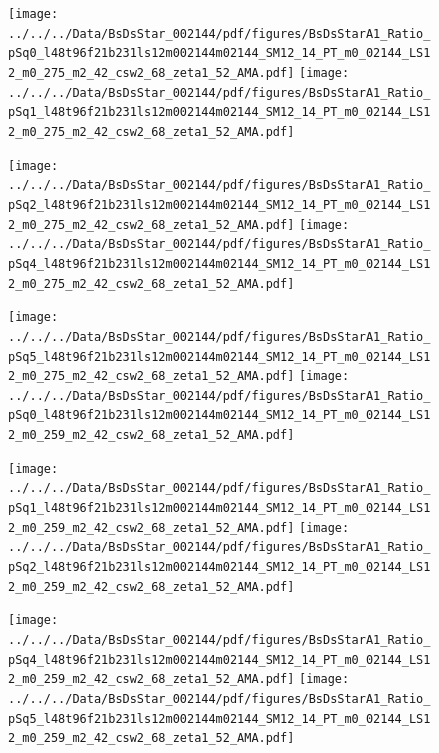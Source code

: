 \documentclass[a4paper,10pt]{article}
\begin{document}
\begin{figure}[p]
 \texttt{[image: ../../../Data/BsDsStar\_002144/pdf/figures/BsDsStarA1\_Ratio\_pSq0\_l48t96f21b231ls12m002144m02144\_SM12\_14\_PT\_m0\_02144\_LS12\_m0\_275\_m2\_42\_csw2\_68\_zeta1\_52\_AMA.pdf]} 
 \texttt{[image: ../../../Data/BsDsStar\_002144/pdf/figures/BsDsStarA1\_Ratio\_pSq1\_l48t96f21b231ls12m002144m02144\_SM12\_14\_PT\_m0\_02144\_LS12\_m0\_275\_m2\_42\_csw2\_68\_zeta1\_52\_AMA.pdf]} 
 \end{figure}
\begin{figure}[p]
 \texttt{[image: ../../../Data/BsDsStar\_002144/pdf/figures/BsDsStarA1\_Ratio\_pSq2\_l48t96f21b231ls12m002144m02144\_SM12\_14\_PT\_m0\_02144\_LS12\_m0\_275\_m2\_42\_csw2\_68\_zeta1\_52\_AMA.pdf]} 
 \texttt{[image: ../../../Data/BsDsStar\_002144/pdf/figures/BsDsStarA1\_Ratio\_pSq4\_l48t96f21b231ls12m002144m02144\_SM12\_14\_PT\_m0\_02144\_LS12\_m0\_275\_m2\_42\_csw2\_68\_zeta1\_52\_AMA.pdf]} 
 \end{figure}
\begin{figure}[p]
 \texttt{[image: ../../../Data/BsDsStar\_002144/pdf/figures/BsDsStarA1\_Ratio\_pSq5\_l48t96f21b231ls12m002144m02144\_SM12\_14\_PT\_m0\_02144\_LS12\_m0\_275\_m2\_42\_csw2\_68\_zeta1\_52\_AMA.pdf]} 
 \texttt{[image: ../../../Data/BsDsStar\_002144/pdf/figures/BsDsStarA1\_Ratio\_pSq0\_l48t96f21b231ls12m002144m02144\_SM12\_14\_PT\_m0\_02144\_LS12\_m0\_259\_m2\_42\_csw2\_68\_zeta1\_52\_AMA.pdf]} 
 \end{figure}
\clearpage
\begin{figure}[p]
 \texttt{[image: ../../../Data/BsDsStar\_002144/pdf/figures/BsDsStarA1\_Ratio\_pSq1\_l48t96f21b231ls12m002144m02144\_SM12\_14\_PT\_m0\_02144\_LS12\_m0\_259\_m2\_42\_csw2\_68\_zeta1\_52\_AMA.pdf]} 
 \texttt{[image: ../../../Data/BsDsStar\_002144/pdf/figures/BsDsStarA1\_Ratio\_pSq2\_l48t96f21b231ls12m002144m02144\_SM12\_14\_PT\_m0\_02144\_LS12\_m0\_259\_m2\_42\_csw2\_68\_zeta1\_52\_AMA.pdf]} 
 \end{figure}
\begin{figure}[p]
 \texttt{[image: ../../../Data/BsDsStar\_002144/pdf/figures/BsDsStarA1\_Ratio\_pSq4\_l48t96f21b231ls12m002144m02144\_SM12\_14\_PT\_m0\_02144\_LS12\_m0\_259\_m2\_42\_csw2\_68\_zeta1\_52\_AMA.pdf]} 
 \texttt{[image: ../../../Data/BsDsStar\_002144/pdf/figures/BsDsStarA1\_Ratio\_pSq5\_l48t96f21b231ls12m002144m02144\_SM12\_14\_PT\_m0\_02144\_LS12\_m0\_259\_m2\_42\_csw2\_68\_zeta1\_52\_AMA.pdf]} 
 \end{figure}
\clearpage
\end{document}
